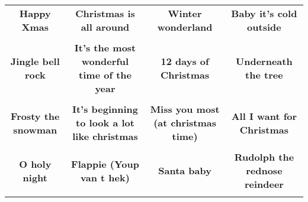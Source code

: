 \documentclass[12pt]{article} \usepackage{eso-pic, graphicx}
\newcommand{\background}[1]{%
\AddToShipoutPictureBG*{\texttt{[image: \#1]}}
}
\begin{document}
\tabcolsep=30.2pt \renewcommand{\arraystretch}{4.5}   \vspace*{4.3cm} \begin{center}  \begin{tabular}{c c c c}
\parbox{3cm}{\centering \textbf{Happy Xmas}}& 
\parbox{3cm}{\centering \textbf{Christmas is all around}}& 
\parbox{3cm}{\centering \textbf{Winter wonderland}}& 
\parbox{3cm}{\centering \textbf{Baby it’s cold outside}}\\ \\ 
\parbox{3cm}{\centering \textbf{Jingle bell rock}}& 
\parbox{3cm}{\centering \textbf{It’s the most wonderful time of the year}}& 
\parbox{3cm}{\centering \textbf{12 days of Christmas}}& 
\parbox{3cm}{\centering \textbf{Underneath the tree}}\\ \\ 
\parbox{3cm}{\centering \textbf{Frosty the snowman}}& 
\parbox{3cm}{\centering \textbf{It’s beginning to look a lot like christmas}}& 
\parbox{3cm}{\centering \textbf{Miss you most (at christmas time)}}& 
\parbox{3cm}{\centering \textbf{All I want for Christmas}}\\ \\ 
\parbox{3cm}{\centering \textbf{O holy night}}& 
\parbox{3cm}{\centering \textbf{Flappie (Youp van t hek)}}& 
\parbox{3cm}{\centering \textbf{Santa baby}}& 
\parbox{3cm}{\centering \textbf{Rudolph the rednose reindeer}}\\ \\ 
\end{tabular} \background{discobingo.pdf} \end{center} 
\end{document}
